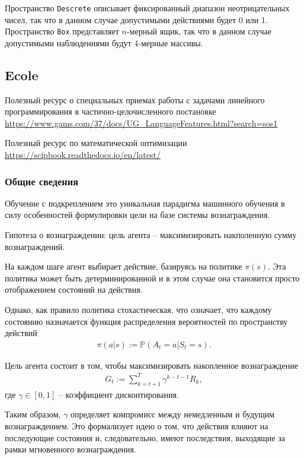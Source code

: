 \documentclass[%
	11pt,
	a4paper,
	utf8,
		]{article}
\begin{document}
Пространство \texttt{Descrete} описывает фиксированный диапазон неотрицательных чисел, так что в данном случае допустимыми действиями будет 0 или 1. Пространство \texttt{Box} представляет $ n $-мерный ящик, так что в данном случае допустимыми наблюдениями будут 4-мерные массивы.

\subsection{Ecole}

Полезный ресурс о специальных приемах работы с задачами линейного программирования в частично-целочисленного постановке \url{https://www.gams.com/37/docs/UG_LanguageFeatures.html?search=sos1}

Полезный ресурс по математической оптимизации \url{https://scipbook.readthedocs.io/en/latest/}

\subsubsection{Общие сведения}

Обучение с подкреплением это уникальная парадигма машинного обучения в силу особенностей формулировки цели на базе системы вознаграждения.

Гипотеза о вознаграждении: цель агента -- максимизировать накполенную сумму вознаграждений.

На каждом шаге агент выбирает действие, базируясь на политике $ \pi(s) $. Эта политика может быть детерминированной и в этом случае она становится просто отображением состояний на действия.

Однако, как правило политика стохастическая, что означает, что каждому состоянию назначается функция распределения вероятностей по пространству действий
\begin{align*}
	\pi (a | s) := \mathbb{P} (A_t = a | S_t = s).
\end{align*}

Цель агента состоит в том, чтобы максимизировать накопленное вознаграждение
\begin{align*}
	G_t := \sum_{k=t+1}^T \gamma^{k-t-1} R_k,
\end{align*}
где $ \gamma \in [0, 1] $ -- коэффициент дисконтирования.

Таким образом, $ \gamma $ определяет компромисс между немедленным и будущим вознаграждением. Это формализует идею о том, что действия влияют на последующие состояния и, следовательно, имеют последствия, выходящие за рамки мгновенного вознаграждения. 
\end{document}
